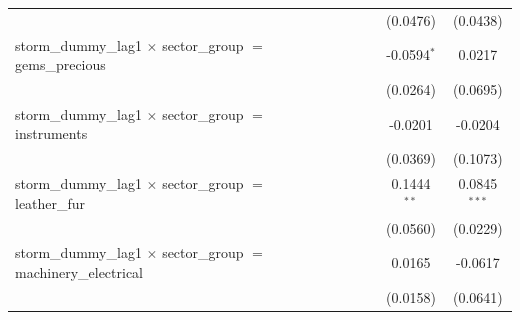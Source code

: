 \begin{tabular}{lcccccccc}
                                                                                  &                       &                       &                       &                       &                       &                       & (0.0476)              & (0.0438)\\   
   storm\_dummy\_lag1 $\times$ sector\_group $=$ gems\_precious                   &                       &                       &                       &                       &                       &                       & -0.0594$^{*}$         & 0.0217\\   
                                                                                  &                       &                       &                       &                       &                       &                       & (0.0264)              & (0.0695)\\   
   storm\_dummy\_lag1 $\times$ sector\_group $=$ instruments                      &                       &                       &                       &                       &                       &                       & -0.0201               & -0.0204\\   
                                                                                  &                       &                       &                       &                       &                       &                       & (0.0369)              & (0.1073)\\   
   storm\_dummy\_lag1 $\times$ sector\_group $=$ leather\_fur                     &                       &                       &                       &                       &                       &                       & 0.1444$^{**}$         & 0.0845$^{***}$\\   
                                                                                  &                       &                       &                       &                       &                       &                       & (0.0560)              & (0.0229)\\   
   storm\_dummy\_lag1 $\times$ sector\_group $=$ machinery\_electrical            &                       &                       &                       &                       &                       &                       & 0.0165                & -0.0617\\   
                                                                                  &                       &                       &                       &                       &                       &                       & (0.0158)              & (0.0641)\\   

\end{tabular}
